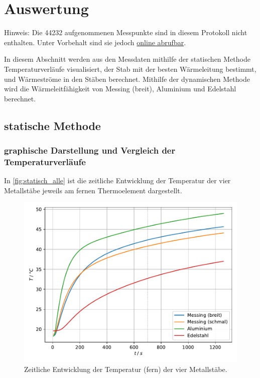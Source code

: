 \section{Auswertung} \label{sec:auswertung}

Hinweis: Die 44232 aufgenommenen Messpunkte sind in diesem Protokoll nicht enthalten.
Unter Vorbehalt sind sie jedoch \href{https://github.com/NicoWeio/AP/tree/master/V204_Waermeleitung}{online abrufbar}.

In diesem Abschnitt werden aus den Messdaten
mithilfe der statischen Methode
Temperaturverläufe visualisiert,
der Stab mit der besten Wärmeleitung bestimmt,
und Wärmeströme in den Stäben berechnet.
Mithilfe der dynamischen Methode wird die Wärmeleitfähigkeit von Messing (breit), Aluminium und Edelstahl berechnet.

\subsection{statische Methode}

\subsubsection{graphische Darstellung und Vergleich der Temperaturverläufe}

In \autoref{fig:statisch_alle} ist die zeitliche Entwicklung der Temperatur der vier Metallstäbe jeweils am fernen Thermoelement dargestellt.

\begin{figure}[H]
  \centering
  \includegraphics{build/plot_statisch_alle.pdf}
  \caption{Zeitliche Entwicklung der Temperatur (fern) der vier Metallstäbe.}
  \label{fig:statisch_alle}
\end{figure}

